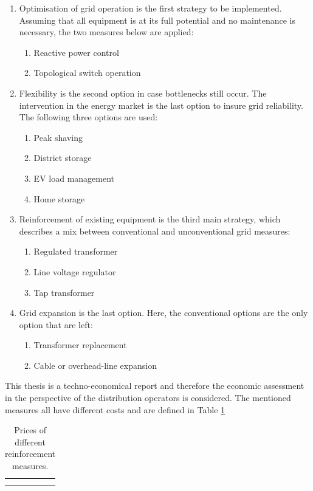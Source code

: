 \begin{enumerate}
    \item Optimisation of grid operation is the first strategy to be implemented. Assuming that all equipment is at its full potential and no maintenance is necessary, the two measures below are applied:
    \begin{enumerate}
        \item Reactive power control
        \item Topological switch operation
    \end{enumerate}
    \item Flexibility is the second option in case bottlenecks still occur. The intervention in the energy market is the last option to insure grid reliability. The following three options are used:
    \begin{enumerate}
        \item Peak shaving
        \item District storage
        \item EV load management
        \item Home storage
    \end{enumerate}
    \item Reinforcement of existing equipment is the third main strategy, which describes a mix between conventional and unconventional grid measures:
    \begin{enumerate}
        \item Regulated transformer
        \item Line voltage regulator
        \item Tap transformer
    \end{enumerate}
    \item Grid expansion is the last option. Here, the conventional options are the only option that are left:
    \begin{enumerate}
        \item Transformer replacement
        \item Cable or overhead-line expansion
    \end{enumerate}
\end{enumerate}

This thesis is a techno-economical report and therefore the economic assessment in the perspective of the distribution operators is considered. The mentioned measures all have different costs and are defined in Table \ref{tab:economicass}

\begin{table}[ht!]
    \centering
    \begin{tabular}{c|c}
         &  \\
         & 
    \end{tabular}
    \caption{Prices of different reinforcement measures.}
    \label{tab:economicass}
\end{table}


